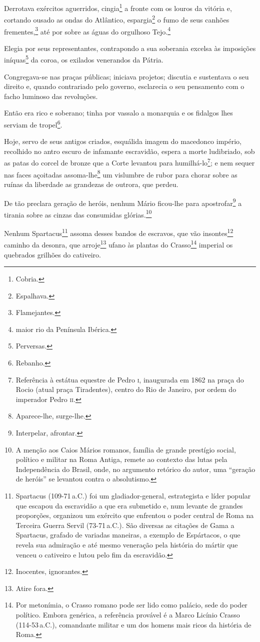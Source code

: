 Derrotava exércitos aguerridos, cingia\footnote{Cobria.} a fronte com
os louros da vitória e, cortando ousado as ondas do Atlântico,
espargia\footnote{Espalhava.} o fumo de seus canhões
frementes,\footnote{Flamejantes.} até por sobre as águas do orgulhoso
Tejo.\footnote{maior rio da Península Ibérica.}

Elegia por seus representantes, contrapondo a sua soberania excelsa às
imposições iníquas\footnote{Perversas.} da coroa, os exilados
venerandos da Pátria.

Congregava-se nas praças públicas; iniciava projetos; discutia e
sustentava o seu direito e, quando contrariado pelo governo, esclarecia
o seu pensamento com o facho luminoso das revoluções.

Então era rico e soberano; tinha por vassalo a monarquia e os fidalgos
lhes serviam de tropel\footnote{Rebanho.}.

Hoje, servo de seus antigos criados, esquálida imagem do macedonco
império, recolhido no antro escuro de infamante escravidão, espera a
morte ludibriado, sob as patas do corcel de bronze que a Corte levantou
para humilhá-lo\footnote{Referência à estátua equestre de Pedro \textsc{i},
  inaugurada em 1862 na praça do Rocio (atual praça Tiradentes), centro
  do Rio de Janeiro, por ordem do imperador Pedro \textsc{ii}.}; e nem sequer nas
faces açoitadas assoma-lhe\footnote{Aparece-lhe, surge-lhe.} um
vislumbre de rubor para chorar sobre as ruínas da liberdade as grandezas
de outrora, que perdeu.

De tão preclara geração de heróis, nenhum Mário ficou-lhe para
apostrofar\footnote{Interpelar, afrontar.} a tirania sobre as cinzas
das consumidas glórias.\footnote{A menção aos Caios Mários romanos,
  família de grande prestígio social, político e militar na Roma Antiga,
  remete ao contexto das lutas pela Independência do Brasil, onde, no
  argumento retórico do autor, uma ``geração de heróis'' se levantou
  contra o absolutismo.}

Nenhum Spartacus\footnote{Spartacus (109-71\,a.C.) foi um
  gladiador-general, estrategista e líder popular que escapou da
  escravidão a que era submetido e, num levante de grandes proporções,
  organizou um exército que enfrentou o poder central de Roma na
  Terceira Guerra Servil (73-71\,a.C.). São diversas as citações de
  Gama a Spartacus, grafado de variadas maneiras, a exemplo de
  Espártacos, o que revela sua admiração e até mesmo veneração pela
  história do mártir que venceu o cativeiro e lutou pelo fim da
  escravidão.} assoma desses bandos de escravos, que vão
insontes\footnote{Inocentes, ignorantes.} caminho da desonra, que
arroje\footnote{Atire fora.} ufano às plantas do Crasso\footnote{Por
  metonímia, o Crasso romano pode ser lido como palácio, sede do poder
  político. Embora genérica, a referência provável é a Marco Licínio
  Crasso (114-53\,a.C.), comandante militar e um dos homens mais ricos da
  história de Roma.} imperial os quebrados grilhões do cativeiro.

